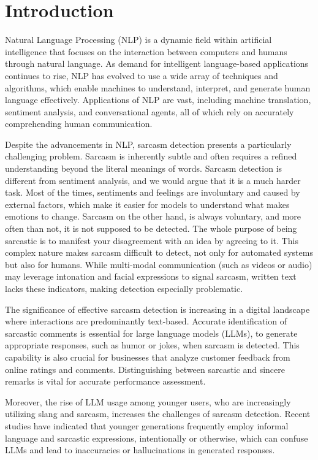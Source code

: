 \section{Introduction}

Natural Language Processing (NLP) is a dynamic field within artificial intelligence that focuses on the interaction between computers and humans through natural language. 
As demand for intelligent language-based applications continues to rise, NLP has evolved to use a wide array of techniques and algorithms, which enable machines to understand, interpret, and 
generate human language effectively. Applications of NLP are vast, including machine translation, sentiment analysis, and conversational agents, all of which rely on accurately comprehending 
human communication.

Despite the advancements in NLP, sarcasm detection presents a particularly challenging problem. Sarcasm is inherently subtle and often requires a refined understanding beyond the literal 
meanings of words. Sarcasm detection is different from sentiment analysis, and we would argue that it is a much harder task. Most of the times, sentiments and feelings are involuntary and caused 
by external factors, which make it easier for models to understand what makes emotions to change. Sarcasm on the other hand, is always voluntary, and more often than not, it is not supposed to 
be detected. The whole purpose of being sarcastic is to manifest your disagreement with an idea by agreeing to it. This complex nature makes sarcasm difficult to detect, not only for automated 
systems but also for humans. While multi-modal communication (such as videos or audio) may leverage intonation and facial expressions to signal sarcasm, written text lacks these indicators, 
making detection especially problematic.

The significance of effective sarcasm detection is increasing in a digital landscape where interactions are predominantly text-based. Accurate identification of sarcastic comments is essential 
for large language models (LLMs), to generate appropriate responses, such as humor or jokes, when sarcasm is detected. This capability is also crucial for businesses that analyze customer 
feedback from online ratings and comments. Distinguishing between sarcastic and sincere remarks is vital for accurate performance assessment.

Moreover, the rise of LLM usage among younger users, who are increasingly utilizing slang and sarcasm, increases the challenges of sarcasm detection. 
Recent studies \cite{Juli_2024} have indicated that younger generations frequently employ informal language and sarcastic expressions, intentionally 
or otherwise, which can confuse LLMs and lead to inaccuracies or hallucinations in generated responses.

